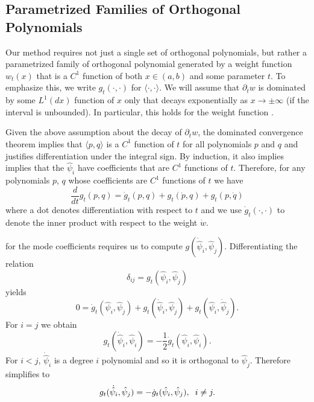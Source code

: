 \begin{subappendices}
\subsection{Parametrized Families of Orthogonal Polynomials}\label{ortho-polynom-fam}
Our method requires not just a single set of orthogonal polynomials, but rather a parametrized family of orthogonal polynomial generated by a weight function $w_t(x)$ that is a $C^1$ function of both $x\in(a,b)$ and some parameter $t$.  To emphasize this, we write $g_t(\cdot,\cdot)$ for $\langle\cdot,\cdot\rangle$.  We will assume that $\partial_t w$ is dominated by some $L^1(dx)$ function of $x$ only that decays exponentially as $x\rightarrow\pm\infty$ (if the interval is unbounded). In particular, this holds for the weight function .

Given the above assumption about the decay of $\partial_t w$, the dominated convergence theorem implies that $\langle p,q\rangle$ is a $C^1$ function of $t$ for all polynomials $p$ and $q$ and justifies  differentiation under the integral sign. By induction, it also implies implies that the $\hat\psi_i$ have coefficients that are $C^1$ functions of $t$. Therefore, for any polynomials $p$, $q$ whose coefficients are $C^1$ functions of $t$ we have
\begin{equation}
\frac{d}{dt}g_t( p,q)=\dot{g}_t(p,q)+g_t(\dot{p},q)+g_t( p,\dot{q})
\end{equation}
where a dot denotes differentiation with respect to $t$ and we use $\dot{g}_t(\cdot,\cdot)$ to denote the inner product with respect to the weight $\dot{w}$.  

 for the mode coefficients requires us to compute $g(\dot{\hat\psi}_i,\hat\psi_j)$.  Differentiating the relation
\begin{equation}
\delta_{ij}=g_t(\hat\psi_i,\hat\psi_j)
\end{equation}
yields
\begin{equation}\label{ortho_deriv_eq}
0=\dot g_t(\hat\psi_i,\hat\psi_j)+g_t(\dot{\hat\psi}_i,\hat\psi_j)+g_t(\hat\psi_i,\dot{\hat\psi}_j).
\end{equation}
For $i=j$ we obtain
\begin{equation}\label{norm_deriv_eq}
g_t(\dot{\hat\psi}_i,\hat\psi_i)=-\frac{1}{2}\dot{g}_t(\hat\psi_i,\hat\psi_i).
\end{equation}
For $i<j$, $\dot{\hat\psi}_i$ is a degree $i$ polynomial and so it is orthogonal to $\hat\psi_j$. Therefore  simplifies to
\begin{equation}
g_t(\dot{\hat\psi}_i,\hat\psi_j)=-\dot{g}_t(\hat\psi_i,\hat\psi_j),\hspace{2mm} i\neq j.
\end{equation}


\end{subappendices}
